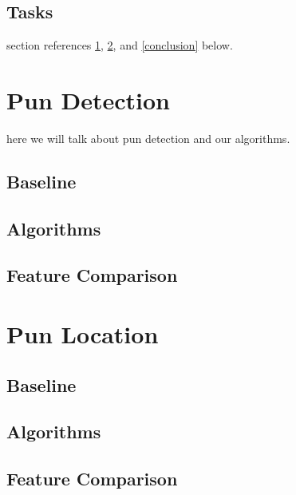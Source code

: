 \documentclass{article}
\begin{document}
\subsection{Tasks}

section references \ref{pun_detection}, \ref{pun_location}, and
\ref{conclusion} below.


\section{Pun Detection}
\label{pun_detection}

here we will talk about pun detection and our algorithms.

\subsection{Baseline}

\subsection{Algorithms}

\subsection{Feature Comparison}

\section{Pun Location}
\label{pun_location}

\subsection{Baseline}

\subsection{Algorithms}

\subsection{Feature Comparison}
\end{document}
